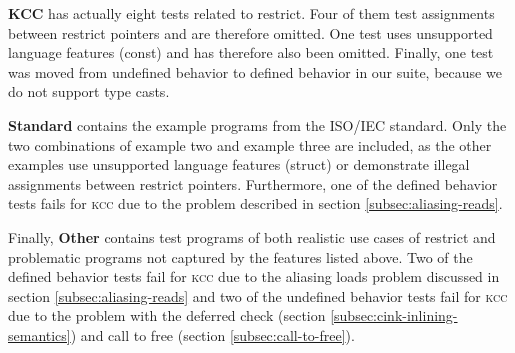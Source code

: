 \textbf{KCC} has actually eight tests related to restrict.
Four of them test assignments between restrict pointers and are therefore omitted.
One test uses unsupported language features (const) and has therefore also been omitted.
Finally, one test was moved from undefined behavior to defined behavior in our suite,
because we do not support type casts.

\textbf{Standard} contains the example programs from the ISO/IEC standard.
Only the two combinations of example two and example three are included, as
the other examples use unsupported language features (struct) or demonstrate illegal
assignments between restrict pointers.
Furthermore, one of the defined behavior tests fails for \textsc{kcc} due to the problem
described in section \ref{subsec:aliasing-reads}.

Finally, \textbf{Other} contains test programs of both realistic use cases of
restrict and problematic programs not captured by the features listed above.
Two of the defined behavior tests fail for \textsc{kcc} due to the aliasing loads problem discussed in
section \ref{subsec:aliasing-reads} and two of the undefined behavior tests fail for \textsc{kcc}
due to the problem with the deferred check (section \ref{subsec:cink-inlining-semantics}) 
and call to free (section \ref{subsec:call-to-free}).




